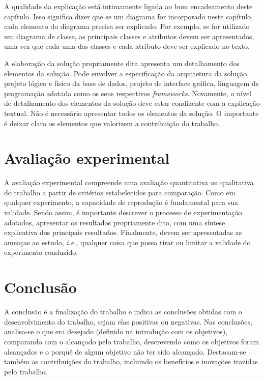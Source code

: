 \documentclass[12pt]{article}
\begin{document}
	A qualidade da explicação está intimamente ligada ao bom encadeamento deste capítulo. Isso significa dizer que se um diagrama for incorporado neste capítulo, cada elemento do diagrama precisa ser explicado. Por exemplo, se for utilizado um diagrama de classe, as principais classes e atributos devem ser apresentados, uma vez que cada uma das classes e cada atributo deve ser explicado no texto.
	
	A elaboração da solução propriamente dita apresenta um detalhamento dos elementos da solução. Pode envolver a especificação da arquitetura da solução, projeto lógico e físico da base de dados, projeto de interface gráfica, linguagem de programação adotada como os seus respectivos \emph{frameworks}. Novamente, o nível de detalhamento dos elementos da solução deve estar condizente com a explicação textual. Não é necessário apresentar todos os elementos da solução. O importante é deixar claro os elementos que valorizem a contribuição do trabalho.
	
	\section{Avaliação experimental}
	\label{sec_aval_exp}
	
	A avaliação experimental compreende uma avaliação quantitativa ou qualitativa do trabalho a partir de critérios estabelecidos para comparação. Como em qualquer experimento, a capacidade de reprodução é fundamental para sua validade. Sendo assim, é importante descrever o processo de experimentação adotados, apresentar os resultados propriamente dito, com uma síntese explicativa dos principais resultados. Finalmente, devem ser apresentadas as ameaças ao estudo, \emph{i.e.}, qualquer coisa que possa tirar ou limitar a validade do experimento conduzido. 
	
	\section{Conclusão}
	\label{sec_conclusao}
	
	A conclusão é a finalização do trabalho e indica as conclusões obtidas com o desenvolvimento do trabalho, sejam elas positivas ou negativas. Nas conclusões, analisa-se o que era desejado (definido na introdução com os objetivos), comparando com o alcançado pelo trabalho, descrevendo como os objetivos foram alcançados e o porquê de algum objetivo não ter sido alcançado. Destacam-se também as contribuições do trabalho, incluindo os benefícios e inovações trazidas pelo trabalho.
	
\end{document}
